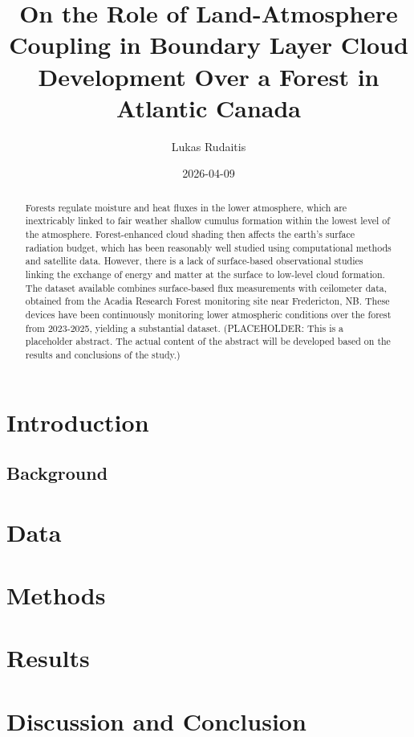 \documentclass[
]{article}
\title{On the Role of Land-Atmosphere Coupling in Boundary Layer Cloud
Development Over a Forest in Atlantic Canada}
\author{Lukas Rudaitis}
\date{2026-04-09}
\renewcommand*\contentsname{Table of contents}
\newcommand\contentsname{Table of contents}
\begin{document}
\maketitle

\renewcommand*\contentsname{Table of contents}
{
\hypersetup{linkcolor=}
\setcounter{tocdepth}{2}
\tableofcontents
}

\newpage
\begin{abstract}
Forests regulate moisture and heat fluxes in the lower atmosphere, which are inextricably linked to fair weather shallow cumulus formation within the lowest level of the atmosphere. Forest-enhanced cloud shading then affects the earth's surface radiation budget, which has been reasonably well studied using computational methods and satellite data. However, there is a lack of surface-based observational studies linking the exchange of energy and matter at the surface to low-level cloud formation. The dataset available combines surface-based flux measurements with ceilometer data, obtained from the Acadia Research Forest monitoring site near Fredericton, NB. These devices have been continuously monitoring lower atmospheric conditions over the forest from 2023-2025, yielding a substantial dataset. (PLACEHOLDER: This is a placeholder abstract. The actual content of the abstract will be developed based on the results and conclusions of the study.)
\end{abstract}

\newpage

\section{Introduction}\label{introduction}

\subsection{Background}\label{background}

\section{Data}\label{data}

\section{Methods}\label{methods}

\section{Results}\label{results}

\section{Discussion and Conclusion}\label{discussion-and-conclusion}
\end{document}
